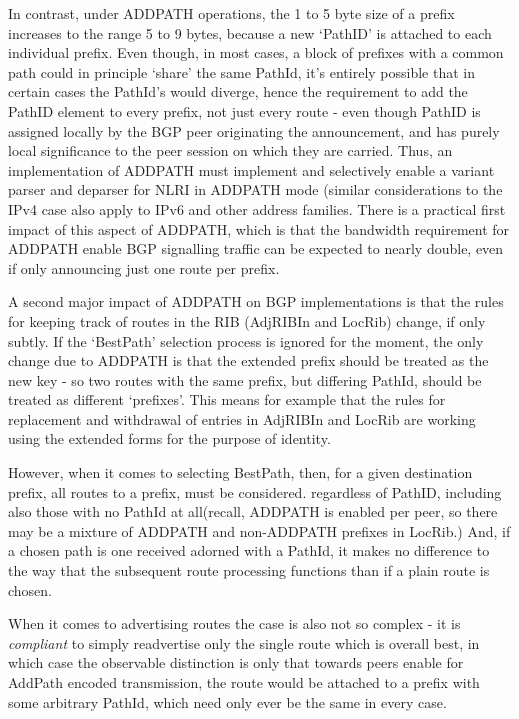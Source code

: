 In contrast, under ADDPATH operations, the 1 to 5 byte size of a prefix increases to the range 5 to 9 bytes, because a new `PathID' is attached to each individual prefix.  Even though, in most cases, a block of prefixes with a common path could in principle `share' the same PathId, it's entirely possible that in certain cases the PathId's would diverge, hence the requirement to add the PathID element to every prefix, not just every route  - even though PathID is assigned locally by the BGP peer originating the announcement, and has purely local significance to the peer session on which they are carried.  Thus, an implementation of ADDPATH must implement and selectively enable a variant parser and deparser for NLRI in ADDPATH mode (similar considerations to the IPv4 case also apply to IPv6 and other address families.  There is a practical first impact of this aspect of ADDPATH, which is that the bandwidth requirement for ADDPATH enable BGP signalling traffic can be expected to nearly double, even if only announcing just one route per prefix.

A second major impact of ADDPATH on BGP implementations is that the rules for keeping track of routes in the RIB (AdjRIBIn and LocRib) change, if only subtly.  If the `BestPath' selection process is ignored for the moment, the only change due to ADDPATH is that the extended prefix should be treated as the new key - so two routes with the same prefix, but differing PathId, should be treated as different `prefixes'.  This means for example that the rules for replacement and withdrawal of entries in AdjRIBIn and LocRib are working using the extended forms for the purpose of identity.

However, when it comes to selecting BestPath, then, for a given destination prefix, all routes to a prefix, must be considered. regardless of PathID, including also those with no PathId  at all(recall, ADDPATH is enabled per peer, so there may be a mixture of ADDPATH and non-ADDPATH prefixes in LocRib.)  And, if a chosen path is one received adorned with a PathId, it makes no difference to the way that the subsequent route processing functions than if a plain route is chosen.

When it comes to advertising routes the case is also not so complex - it is \textit{compliant} to simply readvertise only the single route which is overall best, in which case the observable distinction is only that towards peers enable for AddPath encoded transmission, the route would be attached to a prefix with some arbitrary PathId, which need only ever be the same in every case.

